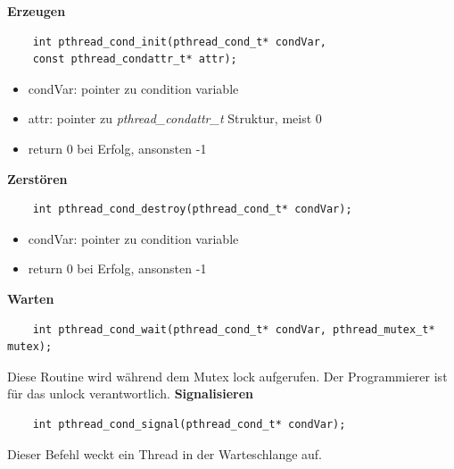 \begin{multicols}{2}
  \textbf{Erzeugen}
  \\
  \begin{lstlisting}
    int pthread_cond_init(pthread_cond_t* condVar,
    const pthread_condattr_t* attr);
  \end{lstlisting}
  \begin{itemize}
    \item condVar: pointer zu condition variable
    \item attr: pointer zu \textit{pthread\_condattr\_t} Struktur, meist 0
    \item return 0 bei Erfolg, ansonsten -1
  \end{itemize}
  \vfill\null
  \columnbreak
  \textbf{Zerstören}
  \\
  \begin{lstlisting}
    int pthread_cond_destroy(pthread_cond_t* condVar);
  \end{lstlisting}
  \begin{itemize}
    \item condVar: pointer zu condition variable
    \item return 0 bei Erfolg, ansonsten -1
  \end{itemize}
\end{multicols}

\begin{multicols}{2}
  \textbf{Warten}
  \begin{lstlisting}
    int pthread_cond_wait(pthread_cond_t* condVar, pthread_mutex_t* mutex);
  \end{lstlisting}
  Diese Routine wird während dem Mutex lock aufgerufen. Der Programmierer ist für das unlock verantwortlich. 
  \vfill\null
  \columnbreak
  \textbf{Signalisieren}
  \begin{lstlisting}
    int pthread_cond_signal(pthread_cond_t* condVar);
  \end{lstlisting}
  Dieser Befehl weckt ein Thread in der Warteschlange auf.
\end{multicols}

